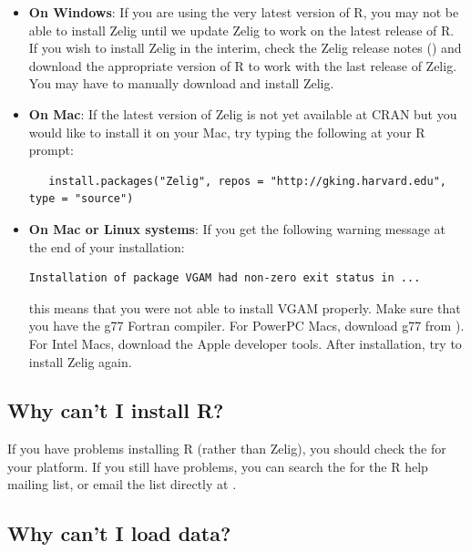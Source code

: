 \begin{itemize}
\item \textbf{On Windows}: If you are using the very latest version of
  R, you may not be able to install Zelig until we update Zelig to
  work on the latest release of R. If you wish to install Zelig in the
  interim, check the Zelig release notes () and
  download the appropriate version of R to work with the last release
  of Zelig.  You may have to manually download and install Zelig.  

\item \textbf{On Mac}: If the latest version of Zelig is not yet
  available at CRAN but you would like to install it on your Mac, try
  typing the following at your R prompt:
\begin{verbatim}
   install.packages("Zelig", repos = "http://gking.harvard.edu", type = "source")
\end{verbatim}

\item \textbf{On Mac or Linux systems}:  
If you get the following
  warning message at the end of your installation:  
\begin{verbatim}
Installation of package VGAM had non-zero exit status in ...
\end{verbatim}
this means that you were not able to install VGAM properly.  Make sure
that you have the g77 Fortran compiler.  For PowerPC Macs, download
g77 from
). For
Intel Macs, download the
 Apple developer
tools.  After installation, try to install Zelig again.  
\end{itemize}

\subsection*{Why can't I install R?}

If you have problems installing R (rather than Zelig), you should
check the  for your
platform.  If you still have problems, you can search the
for the R help mailing list, or email the list directly at
.  

\subsection*{Why can't I load data?}

